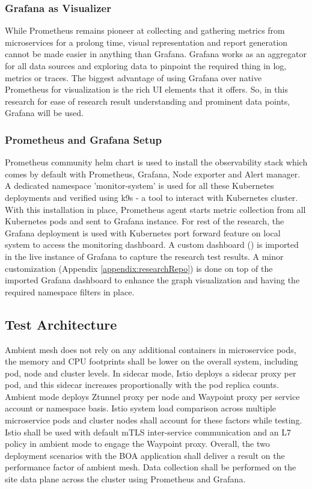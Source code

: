 \subsubsection{Grafana as Visualizer}
While Prometheus remains pioneer at collecting and gathering metrics from microservices for a prolong time, visual representation and report generation cannot be made easier in anything than Grafana. Grafana works as an aggregator for all data sources and exploring data to pinpoint the required thing in log, metrics or traces. The biggest advantage of using Grafana over native Prometheus for visualization is the rich UI elements that it offers. So, in this research for ease of research result understanding and prominent data points, Grafana will be used.

\subsubsection{Prometheus and Grafana Setup}
Prometheus community helm chart is used to install the observability stack which comes by default with Prometheus, Grafana, Node exporter and Alert manager. A dedicated namespace 'monitor-system' is used for all these Kubernetes deployments and verified using k9s - a tool to interact with Kubernetes cluster. With this installation in place, Prometheus agent starts metric collection from all Kubernetes pods and sent to Grafana instance. For rest of the research, the Grafana deployment is used with Kubernetes port forward feature on local system to access the monitoring dashboard. A custom dashboard (\cite{soloGithubPerf}) is imported in the live instance of Grafana to capture the research test results. A minor customization (Appendix \ref{appendix:researchRepo}) is done on top of the imported Grafana dashboard to enhance the graph visualization and having the required namespace filters in place.


\subsection{Test Architecture}
Ambient mesh does not rely on any additional containers in microservice pods, the memory and CPU footprints shall be lower on the overall system, including pod, node and cluster levels. In sidecar mode, Istio deploys a sidecar proxy per pod, and this sidecar increases proportionally with the pod replica counts. Ambient mode deploys Ztunnel proxy per node and Waypoint proxy per service account or namespace basis. Istio system load comparison across multiple microservice pods and cluster nodes shall account for these factors while testing. Istio shall be used with default mTLS inter-service communication and an L7 policy in ambient mode to engage the Waypoint proxy. Overall, the two deployment scenarios with the BOA application shall deliver a result on the performance factor of ambient mesh. Data collection shall be performed on the site data plane across the cluster using Prometheus and Grafana.

